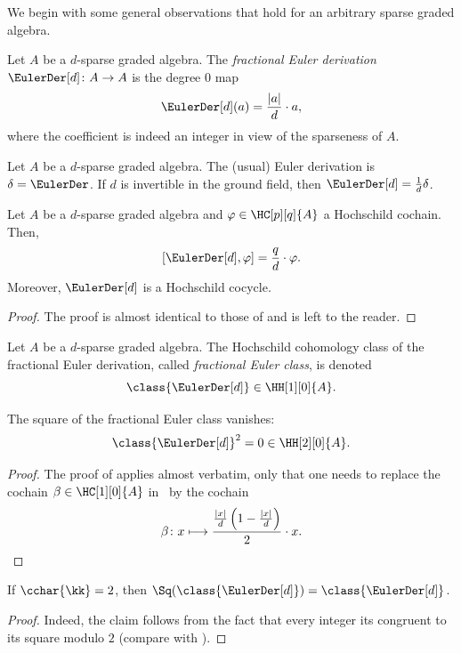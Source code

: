 \documentclass[a4paper]{amsart}
\begin{document}
We begin with some general observations that hold for an arbitrary sparse graded
algebra.

\begin{definition}
  Let $A$ be a $d$-sparse graded algebra. The \emph{fractional Euler derivation}
  $\EulerDer[d]\colon A\to A$ is the degree $0$ map
  \[
    \EulerDer[d](a)=\frac{|a|}{d}\cdot a,
  \]
  where the coefficient is indeed an integer in view of the sparseness of $A$.
\end{definition}

\begin{remark}
  Let $A$ be a $d$-sparse graded algebra. The (usual) Euler derivation is
  $\delta=\EulerDer$. If $d$ is invertible in the ground field, then
  $\EulerDer[d]=\frac{1}{d}\delta$.
\end{remark}

\begin{proposition}
  \label{prop:euler_lie}
  Let $A$ be a $d$-sparse graded algebra and $\varphi\in\HC[p][q]{A}$ a
  Hochschild cochain. Then,
  \[
    [\EulerDer[d],\varphi]=\frac{q}{d}\cdot\varphi.
  \]
  Moreover, $\EulerDer[d]$ is a Hochschild cocycle.
\end{proposition}
\begin{proof}
  The proof is almost identical to those of \cite[Prop.~3.2 and Cor.~3.3]{Mur22}
  and is left to the reader.
\end{proof}

\begin{notation}
  Let $A$ be a $d$-sparse graded algebra. The Hochschild cohomology class of the
  fractional Euler derivation, called \emph{fractional Euler class}, is denoted
  \[
    \class{\EulerDer[d]}\in\HH[1][0]{A}.
  \]
\end{notation}

\begin{proposition}
  \label{prop:euler_square}
  The square of the fractional Euler class vanishes:
  \[
    \class{\EulerDer[d]}^2=0\in\HH[2][0]{A}.
  \]
\end{proposition}
\begin{proof}
  The proof of \cite[Prop.~3.8]{Mur22} applies almost verbatim, only that one
  needs to replace the cochain $\beta\in\HC[1][0]{A}$ in \loccit~by the cochain
  \[
    \beta\colon x\longmapsto
    \frac{\frac{|x|}{d}\left(1-\frac{|x|}{d}\right)}{2}\cdot x.\qedhere
  \]
\end{proof}

\begin{proposition}
  If $\cchar{\kk}=2$, then $\Sq(\class{\EulerDer[d]})=\class{\EulerDer[d]}$.
\end{proposition}
\begin{proof}
  Indeed, the claim follows from the fact that every integer its congruent to
  its square modulo $2$ (compare with \cite[Prop.~3.5]{Mur22}).
\end{proof}
\end{document}
